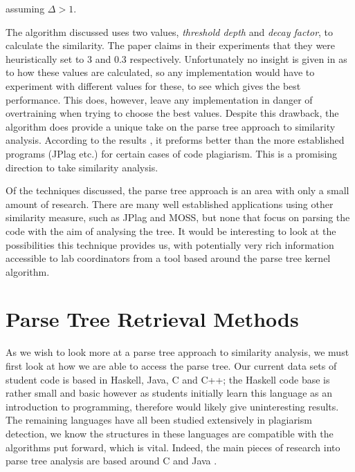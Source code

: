 assuming $\Delta > 1$.

The algorithm discussed uses two values, \emph{threshold depth} and 
\emph{decay factor}, to calculate the similarity. The paper claims in their
experiments that they were heuristically set to 3 and 0.3 respectively.
Unfortunately no insight is given in \cite{ParseTreeKernel} as to how these
values are calculated, so any implementation would have to experiment with
different values for these, to see which gives the best performance.
This does, however, leave any implementation in danger of overtraining
when trying to choose the best values. Despite this drawback, the algorithm does
provide a unique take on the parse tree approach to similarity analysis. According
to the results \cite{ParseTreeKernel}, it preforms better than the more established
programs (JPlag etc.) for certain cases of code plagiarism. This is a promising
direction to take similarity analysis.

Of the techniques discussed, the parse tree approach is an area with only a small
amount of research. There are many well established applications using other
similarity measure, such as JPlag\cite{JPlag} and MOSS\cite{winnowing}, 
but none that focus on parsing the code with the aim of
analysing the tree. It would be interesting to look at the possibilities this
technique provides us, with potentially very rich information accessible to
lab coordinators from a tool based around the parse tree kernel algorithm.

\label{sec:parseTreeKernel}

\section{Parse Tree Retrieval Methods}

As we wish to look more at a parse tree approach to similarity analysis, we must
first look at how we are able to access the parse tree. Our current data sets of
student code is based in Haskell, Java, C and C++; the Haskell code base is rather
small and basic however as students initially learn this language as an introduction
to programming, therefore would likely give uninteresting results. The remaining
languages have all been studied extensively in plagiarism detection, we know the
structures in these languages are compatible with the algorithms put forward,
which is vital. Indeed, the main pieces of research into parse tree analysis
are based around C \cite{Belkhouche} and Java \cite{ParseTreeKernel}.

